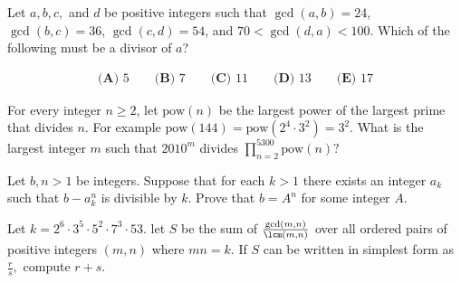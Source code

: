 \documentclass[mast]{lucky}
\begin{document}
\begin{prob}[AMC 10A 2018/22]{9}
Let $a, b, c,$ and $d$ be positive integers such that $\gcd(a, b)=24$, $\gcd(b, c)=36$, $\gcd(c, d)=54$, and $70<\gcd(d, a)<100$. Which of the following must be a divisor of $a$?

\begin{align*}\textbf{(A)} \text{ 5} \qquad \textbf{(B)} \text{ 7} \qquad \textbf{(C)} \text{ 11} \qquad \textbf{(D)} \text{ 13} \qquad \textbf{(E)} \text{ 17}\end{align*}


\end{prob}

\begin{prob}[AMC 12B 2010/25]{9}
For every integer $n\ge2$, let $\text{pow}(n)$ be the largest power of the largest prime that divides $n$. For example $\text{pow}(144)=\text{pow}(2^4\cdot3^2)=3^2$. What is the largest integer $m$ such that $2010^m$ divides $\prod\limits_{n=2}^{5300}\text{pow}(n)?$
\end{prob}

\begin{prob}[ISL 2007/N2]{13}
Let $b,n > 1$ be integers. Suppose that for each $k > 1$ there exists an integer $a_k$ such that $b - a^n_k$ is divisible by $k$. Prove that $b = A^n$ for some integer $A$.
\end{prob}

\begin{prob}[PUMaC 2016]{13}
Let $k=2^6\cdot 3^5\cdot 5^2\cdot 7^3\cdot 53.$ let $S$ be the sum of $\frac{\gcd(m,n)}{\lcm(m,n)}$ over all ordered pairs of positive integers $(m,n)$ where $mn=k.$ If $S$ can be written in simplest form as $\frac{r}{s},$ compute $r+s.$
\end{prob}
\end{document}
